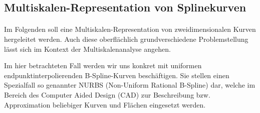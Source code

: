 \documentclass{article}
\newcommand{\R}{{\rm I\!R}}
\begin{document}
\subsection{Multiskalen-Representation von Splinekurven}

\paragraph{}



Im Folgenden soll eine Multiskalen-Representation von zweidimensionalen Kurven hergeleitet werden. Auch diese oberflächlich grundverschiedene Problemstellung lässt sich im Kontext der Multiskalenanalyse angehen.

\noindent Im hier betrachteten Fall werden wir uns konkret mit uniformen endpunktinterpolierenden B-Spline-Kurven beschäftigen. Sie stellen einen Spezialfall so genannter NURBS (Non-Uniform Rational B-Spline) dar, welche im Bereich des Computer Aided Design (CAD) zur Beschreibung bzw. Approximation beliebiger Kurven und Flächen eingesetzt werden.
\end{document}
